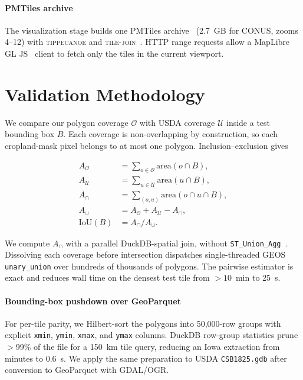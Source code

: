 \documentclass[preprint,12pt]{elsarticle}
\begin{document}
\paragraph{PMTiles archive} The visualization stage builds one PMTiles
archive~\cite{pmtiles} (2.7~GB for CONUS, zooms 4--12) with
\textsc{tippecanoe} and \textsc{tile-join}~\cite{tippecanoe}. HTTP range
requests allow a
MapLibre GL JS~\cite{maplibre} client to fetch only the tiles in the current
viewport.

\section{Validation Methodology}
\label{sec:val-method}

We compare our polygon coverage $\mathcal{O}$ with USDA coverage
$\mathcal{U}$ inside a test bounding box $B$. Each coverage is
non-overlapping by construction, so each cropland-mask pixel belongs to at
most one polygon. Inclusion--exclusion gives

\begin{align}
A_\mathcal{O}    &= \textstyle\sum_{o\in\mathcal{O}} \text{area}(o \cap B), \\
A_\mathcal{U}    &= \textstyle\sum_{u\in\mathcal{U}} \text{area}(u \cap B), \\
A_\cap           &= \textstyle\sum_{(o,u)} \text{area}(o \cap u \cap B), \\
A_\cup           &= A_\mathcal{O} + A_\mathcal{U} - A_\cap, \\
\text{IoU}(B)    &= A_\cap / A_\cup.
\end{align}

We compute $A_\cap$ with a parallel DuckDB-spatial join, without
\texttt{ST\_Union\_Agg}~\cite{duckdbspatial}. Dissolving each coverage before
intersection dispatches single-threaded GEOS \texttt{unary\_union} over
hundreds of thousands of polygons. The pairwise estimator is exact and
reduces wall time on the densest test tile from $>10$~min to 25~s.

\paragraph{Bounding-box pushdown over GeoParquet}
For per-tile parity, we Hilbert-sort the polygons into 50{,}000-row groups
with explicit \texttt{xmin}, \texttt{ymin}, \texttt{xmax}, and \texttt{ymax}
columns. DuckDB row-group statistics prune $>$99\% of the file for a 150~km
tile query, reducing an Iowa extraction from minutes to 0.6~s. We apply the
same preparation to USDA \texttt{CSB1825.gdb} after conversion to GeoParquet
with GDAL/OGR.
\end{document}
